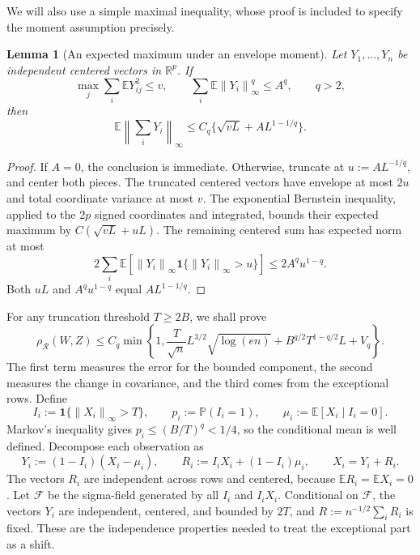 \documentclass[11pt,letterpaper]{article}
\newtheorem{lemma}{Lemma}
\theoremstyle{remark}
\newcommand{\E}{\mathbb E}
\newcommand{\Pp}{\mathbb P}
\newcommand{\R}{\mathbb R}
\newcommand{\norm}[1]{\left\lVert#1\right\rVert}
\newcommand{\rh}{\rho_{\mathcal R}}
\newcommand{\ind}{\mathbf 1}
\begin{document}
We will also use a simple maximal inequality, whose proof is included
to specify the moment assumption precisely.

\begin{lemma}[An expected maximum under an envelope moment]\label{lem:maximum}
Let \(Y_1,\ldots,Y_n\) be independent centered vectors in \(\R^p\).
If
\[
 \max_j\sum_i\E Y_{ij}^2\le v,\qquad
 \sum_i\E\norm{Y_i}_\infty^q\le A^q,\qquad q>2,
\]
then
\begin{equation}
 \E\norm{\sum_iY_i}_\infty
 \le C_q\{\sqrt{vL}+AL^{1-1/q}\}.
 \label{app:maximal}
\end{equation}
\end{lemma}
\begin{proof}
If \(A=0\), the conclusion is immediate. Otherwise, truncate at
\(u:=AL^{-1/q}\), and center both pieces. The truncated centered
vectors have envelope at most \(2u\) and total coordinate variance at
most \(v\). The exponential Bernstein inequality, applied to the
\(2p\) signed coordinates and integrated, bounds their expected maximum
by \(C(\sqrt{vL}+uL)\). The remaining centered sum has expected norm
at most
\[
 2\sum_i\E[\norm{Y_i}_\infty\ind\{\norm{Y_i}_\infty>u\}]
 \le2A^qu^{1-q}.
\]
Both \(uL\) and \(A^qu^{1-q}\) equal \(AL^{1-1/q}\).
\end{proof}

For any truncation threshold \(T\ge2B\), we shall prove
\begin{equation}
 \rh(W,Z)\le C_q\min\left\{1,
 \frac{T}{\sqrt n}L^{3/2}\sqrt{\log(en)}
 +B^{q/2}T^{1-q/2}L+V_q\right\}.
 \label{poly:threshold}
\end{equation}
The first term measures the error for the bounded component, the
second measures the change in covariance, and the third comes from
the exceptional rows. Define
\[
 I_i:=\ind\{\norm{X_i}_\infty>T\},\qquad
 p_i:=\Pp(I_i=1),\qquad \mu_i:=\E[X_i\mid I_i=0].
\]
Markov's inequality gives \(p_i\le(B/T)^q<1/4\), so the conditional
mean is well defined. Decompose each observation as
\begin{equation}
 Y_i:=(1-I_i)(X_i-\mu_i),\qquad
 R_i:=I_iX_i+(1-I_i)\mu_i,\qquad X_i=Y_i+R_i.
 \label{app:decomposition}
\end{equation}
The vectors \(R_i\) are independent across rows and centered, because
\(\E R_i=\E X_i=0\). Let \(\mathcal F\) be the sigma-field generated
by all \(I_i\) and \(I_iX_i\). Conditional on \(\mathcal F\), the
vectors \(Y_i\) are independent, centered, and bounded by \(2T\),
and \(R:=n^{-1/2}\sum_iR_i\) is fixed. These are the independence
properties needed to treat the exceptional part as a shift.
\end{document}
